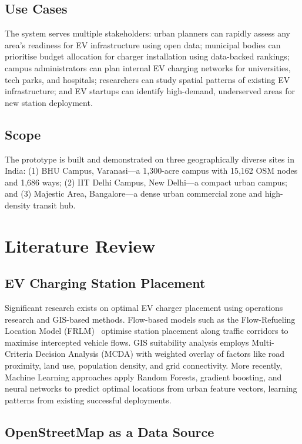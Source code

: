 \documentclass[conference]{IEEEtran}
\begin{document}
\subsection{Use Cases}

The system serves multiple stakeholders: urban planners can rapidly assess any area's readiness for EV infrastructure using open data; municipal bodies can prioritise budget allocation for charger installation using data-backed rankings; campus administrators can plan internal EV charging networks for universities, tech parks, and hospitals; researchers can study spatial patterns of existing EV infrastructure; and EV startups can identify high-demand, underserved areas for new station deployment.

\subsection{Scope}

The prototype is built and demonstrated on three geographically diverse sites in India: (1) BHU Campus, Varanasi---a 1,300-acre campus with 15,162 OSM nodes and 1,686 ways; (2) IIT Delhi Campus, New Delhi---a compact urban campus; and (3) Majestic Area, Bangalore---a dense urban commercial zone and high-density transit hub.


\section{Literature Review}

\subsection{EV Charging Station Placement}

Significant research exists on optimal EV charger placement using operations research and GIS-based methods. Flow-based models such as the Flow-Refueling Location Model (FRLM)~\cite{b7} optimise station placement along traffic corridors to maximise intercepted vehicle flows. GIS suitability analysis employs Multi-Criteria Decision Analysis (MCDA) with weighted overlay of factors like road proximity, land use, population density, and grid connectivity. More recently, Machine Learning approaches apply Random Forests, gradient boosting, and neural networks to predict optimal locations from urban feature vectors, learning patterns from existing successful deployments.

\subsection{OpenStreetMap as a Data Source}
\end{document}
